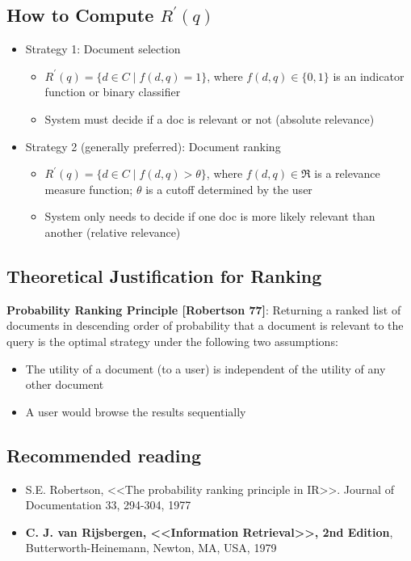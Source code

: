 \subsection{How to Compute $R^\prime(q)$}
\begin{itemize}
\item Strategy 1: Document selection
    \begin{itemize}
    \item $R^\prime(q)=\{d \in C \mid f(d,q)=1\}$, where $f(d,q) \in \{0,1\}$ is an indicator function or binary classifier
    \item System must decide if a doc is relevant or not (absolute relevance)
    \end{itemize}
\item Strategy 2 (generally preferred): Document ranking
    \begin{itemize}
    \item $R^\prime(q)=\{d \in C \mid f(d,q)>\theta\}$, where $f(d,q) \in \Re$ is a relevance measure function; $\theta$ is a cutoff determined by the user
    \item System only needs to decide if one doc is more likely relevant than another (relative relevance)
    \end{itemize}
\end{itemize}


\subsection{Theoretical Justification for Ranking}
\textbf{Probability Ranking Principle [Robertson 77]}: Returning a ranked list of documents in descending order of probability that a document is relevant to the query is the optimal strategy under the following two assumptions:
\begin{itemize}
\item The utility of a document (to a user) is independent of the utility of any other document
\item A user would browse the results sequentially
\end{itemize}


\subsection{Recommended reading}
\begin{itemize}
\item S.E. Robertson, <<The probability ranking principle in IR>>. Journal of Documentation 33, 294-304, 1977
\item \textbf{C. J. van Rijsbergen, <<Information Retrieval>>, 2nd Edition}, Butterworth-Heinemann, Newton, MA, USA, 1979
\end{itemize}


